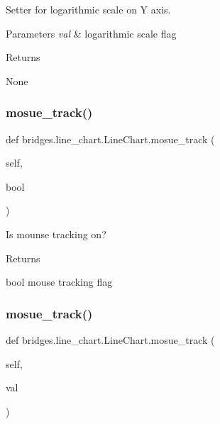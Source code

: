 Setter for logarithmic scale on Y axis. 


\begin{DoxyParams}{Parameters}
{\em val} & logarithmic scale flag \\
\hline
\end{DoxyParams}
\begin{DoxyReturn}{Returns}


None 
\end{DoxyReturn}
\mbox{\label{classbridges_1_1line__chart_1_1_line_chart_ad189e3efb7abb05944067fc171f6baf8}} 
\subsubsection{\texorpdfstring{mosue\+\_\+track()}{mosue\_track()}\hspace{0.1cm}{\footnotesize\ttfamily [1/2]}}
{\footnotesize\ttfamily def bridges.\+line\+\_\+chart.\+Line\+Chart.\+mosue\+\_\+track (\begin{DoxyParamCaption}\item[{}]{self,  }\item[{}]{bool }\end{DoxyParamCaption})}



Is mounse tracking on? 

\begin{DoxyReturn}{Returns}


bool mouse tracking flag 
\end{DoxyReturn}
\mbox{\label{classbridges_1_1line__chart_1_1_line_chart_a193acd762b88d9e112729adf56cdbcd2}} 
\subsubsection{\texorpdfstring{mosue\+\_\+track()}{mosue\_track()}\hspace{0.1cm}{\footnotesize\ttfamily [2/2]}}
{\footnotesize\ttfamily def bridges.\+line\+\_\+chart.\+Line\+Chart.\+mosue\+\_\+track (\begin{DoxyParamCaption}\item[{}]{self,  }\item[{}]{val }\end{DoxyParamCaption})}



